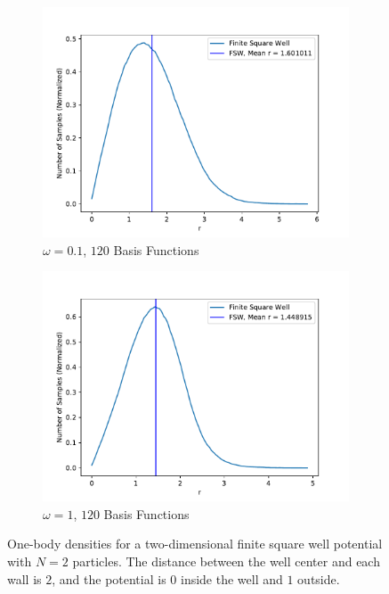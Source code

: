 \documentclass[../main.tex]{subfiles}
\begin{document}
\begin{figure}
\medskip
\begin{subfigure}{0.48\textwidth}
\includegraphics[width=\linewidth]{figures/densityFSW/density_FSW_N2_Omega010_2d_BF120.pdf}
\caption{$\omega=0.1$, $120$ Basis Functions} \label{fig:FSW_N2_2d_e}
\end{subfigure}\hspace*{\fill}
\begin{subfigure}{0.48\textwidth}
\includegraphics[width=\linewidth]{figures/densityFSW/density_FSW_N2_Omega1_2d_BF120.pdf}
\caption{$\omega=1$, $120$ Basis Functions} \label{fig:FSW_N2_2d_f}
\end{subfigure}

\caption{One-body densities for a two-dimensional finite square well potential with $N=2$ particles. The distance between the well center and each wall is $2$, and the potential is $0$ inside the well and $1$ outside.} \label{fig:FSW_N2_2d}
\end{figure}
\end{document}
